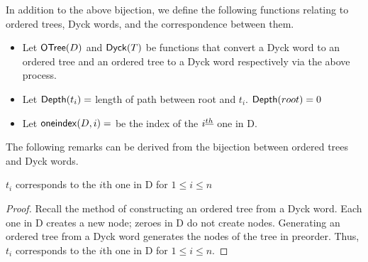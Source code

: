 In addition to the above bijection, we define the following functions relating to ordered trees, Dyck words, and the correspondence between them.

\begin{itemize}
    \item Let $\mathsf{OTree}{(D)}$ and $\mathsf{Dyck}{(T)}$ be functions that convert a Dyck word to an ordered tree and an ordered tree to a Dyck word respectively via the above process.
    \item Let $\mathsf{Depth}{(t_i)}=$ length of path between root and $t_i$. $\mathsf{Depth}{(root)}=0$
    \item Let $\mathsf{oneindex}({D}, i)=$ be the index of the $i^{\underline{th}}{}$ one in D.
\end{itemize}

\bigskip


The following remarks can be derived from the bijection between ordered trees and Dyck words.


\begin{remark}
    $t_i$ corresponds to the $i$th one in D for $1 \le i \le n$
\end{remark}
\begin{proof}
    Recall the method of constructing an ordered tree from a Dyck word.  Each one in D creates a new node; zeroes in D do not create nodes.  Generating an ordered tree from a Dyck word generates the nodes of the tree in preorder.  Thus, $t_i$ corresponds to the $i$th one in D for $1 \le i \le n$.
\end{proof}

